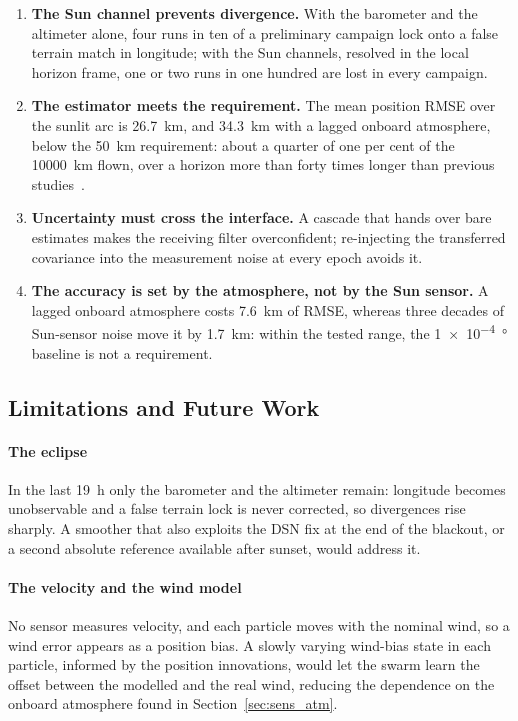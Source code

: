 \documentclass[preprint,12pt,a4paper]{elsarticle}
\begin{document}
\begin{enumerate}
\item \textbf{The Sun channel prevents divergence.}
With the barometer and the altimeter alone, four runs in ten of a preliminary campaign lock
onto a false terrain match in longitude; with the Sun channels, resolved in the local horizon
frame, one or two runs in one hundred are lost in every campaign.
\item \textbf{The estimator meets the requirement.}
The mean position RMSE over the sunlit arc is \SI{26.7}{km}, and \SI{34.3}{km} with a lagged
onboard atmosphere, below the \SI{50}{km} requirement: about a quarter of one per cent of the
\SI{10000}{km} flown, over a horizon more than forty times longer than previous
studies~\cite{Ploen2023,Cottrill2024}.
\item \textbf{Uncertainty must cross the interface.}
A cascade that hands over bare estimates makes the receiving filter overconfident;
re-injecting the transferred covariance into the measurement noise at every epoch avoids it.
\item \textbf{The accuracy is set by the atmosphere, not by the Sun sensor.}
A lagged onboard atmosphere costs \SI{7.6}{km} of RMSE, whereas three decades of Sun-sensor
noise move it by \SI{1.7}{km}: within the tested range, the \SI{1e-4}{\degree} baseline is
not a requirement.
\end{enumerate}

\subsection{Limitations and Future Work}

\paragraph{The eclipse}
In the last \SI{19}{h} only the barometer and the altimeter remain: longitude becomes
unobservable and a false terrain lock is never corrected, so divergences rise sharply.
A smoother that also exploits the DSN fix at the end of the blackout, or a second absolute
reference available after sunset, would address it.

\paragraph{The velocity and the wind model}
No sensor measures velocity, and each particle moves with the nominal wind, so a wind error
appears as a position bias.
A slowly varying wind-bias state in each particle, informed by the position innovations,
would let the swarm learn the offset between the modelled and the real wind, reducing the
dependence on the onboard atmosphere found in Section~\ref{sec:sens_atm}.
\end{document}
